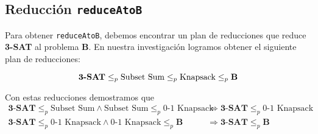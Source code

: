 \setcounter{subsection}{3}
\subsection{Reducci\'on \texttt{reduceAtoB}}
 
Para obtener \texttt{reduceAtoB}, debemos encontrar un plan de reducciones 
que reduce \textbf{3-SAT} al problema \textbf{B}. 
En nuestra investigaci\'on logramos obtener el siguiente plan de reducciones:

\[
  \textbf{3-SAT} \le_{p}
  \textnormal{Subset Sum} \le_{p}
  \textnormal{Knapsack} \le_{p} 
  \textbf{B}
\]


\newpage

\newpage


Con estas reducciones demostramos que 
\begin{align*}
    \textbf{3-SAT} \le_{p} \text{Subset Sum} \land
    \text{Subset Sum} \le_{p} \text{0-1 Knapsack} 
    &\Rightarrow \textbf{3-SAT} \le_{p} \text{0-1 Knapsack} \\
    \textbf{3-SAT} \le_{p} \text{0-1 Knapsack} \land
    \text{0-1 Knapsack} \le_{p} \textbf{B} 
    &\Rightarrow \textbf{3-SAT} \le_{p} \textbf{B}
\end{align*}


